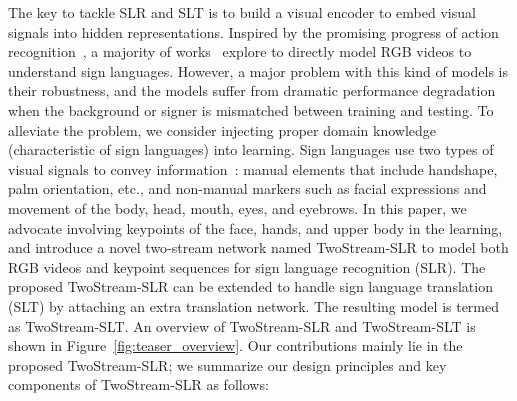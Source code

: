 \documentclass{article}
\begin{document}
The key to tackle SLR and SLT is to build a visual encoder to embed visual signals into hidden representations. 
Inspired by the promising progress of action recognition~\cite{ji20123d,tran2015learning,carreira2017quo,xie2018rethinking,liu2021video,arnab2021vivit}, a majority of works~\cite{Min_2021_ICCV,Hao_2021_ICCV,CrossAug_MM2020,fcn_eccv2020,niu2020stochastic,subunet_iccv2017} explore to directly model RGB videos to understand sign languages. However, a major problem with this kind of models is their robustness, and the models suffer from dramatic performance degradation when the background or signer is mismatched between training and testing. To alleviate the problem, we consider injecting proper domain knowledge (characteristic of sign languages) into learning.
Sign languages use two types of visual signals to convey information~\cite{koller2020quantitative}: manual elements that include handshape, palm orientation, etc., and non-manual markers such as facial expressions and movement of the body, head, mouth, eyes, and eyebrows. In this paper, we advocate involving keypoints of the face, hands, and upper body in the learning, and introduce a novel two-stream network named TwoStream-SLR to model both RGB videos and keypoint sequences for sign language recognition (SLR). The proposed TwoStream-SLR can be extended to handle sign language translation (SLT) by attaching an extra translation network. The resulting model is termed as TwoStream-SLT. An overview of TwoStream-SLR and TwoStream-SLT is shown in Figure~\ref{fig:teaser_overview}. Our contributions mainly lie in the proposed TwoStream-SLR; we summarize our design principles and key components of TwoStream-SLR as follows:
\end{document}
